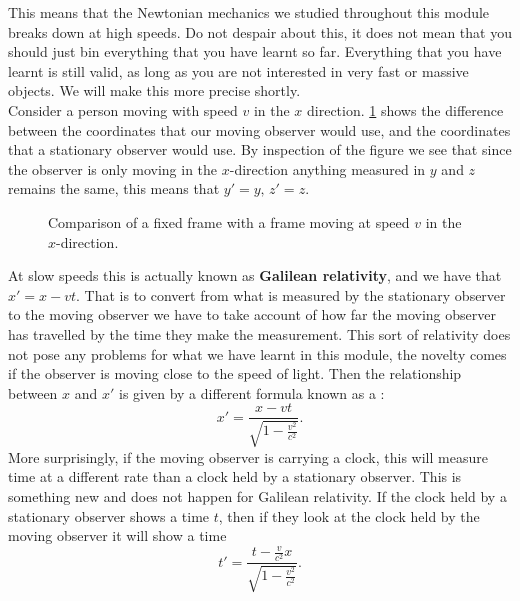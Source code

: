 \documentclass[a4paper,12pt]{book}
\begin{document}
This means that the Newtonian mechanics we studied throughout this module breaks down at high speeds. Do not despair about this, it does not mean that you should just bin everything that you have learnt so far. Everything that you have learnt is still valid, as long as you are not interested in very fast or massive objects. We will make this more precise shortly.\\

Consider a person moving with speed $v$ in the $x$ direction. \cref{fig: moving frames} shows the difference between the coordinates that our moving observer would use, and the coordinates that a stationary observer would use. By inspection of the figure we see that since the observer is only moving in the $x$-direction anything measured in $y$ and $z$ remains the same, this means that $y'=y,\,z'=z$.\\

\begin{figure}[ht]
    \centering
    \caption{Comparison of a fixed frame with a frame moving at speed $v$ in the $x$-direction.}
    \label{fig: moving frames}
\end{figure} 

At slow speeds this is actually known as \textbf{Galilean relativity}, and we have that $x'=x-vt$. That is to convert from what is measured by the stationary observer to the moving observer we have to take account of how far the moving observer has travelled by the time they make the measurement. This sort of relativity does not pose any problems for what we have learnt in this module, the novelty comes if the observer is moving close to the speed of light. Then the relationship between $x$ and $x'$ is given by a different formula known as a :
\begin{equation}
x'=\frac{x-vt}{\sqrt{1-\frac{v^{2}}{c^{2}}}}.
\label{eq: length contraction}
\end{equation}
More surprisingly, if the moving observer is carrying a clock, this will measure time at a different rate than a clock held by a stationary observer. This is something new and does not happen for Galilean relativity. If the clock held by a stationary observer shows a time $t$, then if they look at the clock held by the moving observer it will show a time
\begin{equation}
t'=\frac{t-\frac{v}{c^{2}}x}{\sqrt{1-\frac{v^{2}}{c^{2}}}}.
\label{eq: time dilation}
\end{equation}
\end{document}
